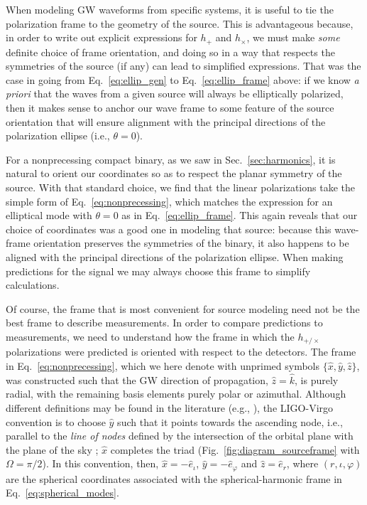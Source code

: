 \documentclass[aps,prd,twocolumn,superscriptaddress,preprintnumbers,floatfix,nofootinbib]{revtex4-2}
\newcommand*{\eq}[1]{Eq.~\eqref{eq:#1}}
\begin{document}
When modeling GW waveforms from specific systems, it is useful to tie the polarization frame to the geometry of the source.
This is advantageous because, in order to write out explicit expressions for $h_+$ and $h_\times$, we must make \emph{some} definite choice of frame orientation, and doing so in a way that respects the symmetries of the source (if any) can lead to simplified expressions.
That was the case in going from Eq.~\eqref{eq:ellip_gen} to Eq.~\eqref{eq:ellip_frame} above: if we know \emph{a priori} that the waves from a given source will always be elliptically polarized, then it makes sense to anchor our wave frame to some feature of the source orientation that will ensure alignment with the principal directions of the polarization ellipse (i.e., $\theta=0$).

For a nonprecessing compact binary, as we saw in Sec.~\ref{sec:harmonics}, it is natural to orient our coordinates so as to respect the planar symmetry of the source.
With that standard choice, we find that the linear polarizations take the simple form of \eq{nonprecessing}, which matches the expression for an elliptical mode with $\theta=0$ as in \eq{ellip_frame}.
This again reveals that our choice of coordinates was a good one in modeling that source: because this wave-frame orientation preserves the symmetries of the binary, it also happens to be aligned with the principal directions of the polarization ellipse.
%
When making predictions for the signal we may always choose this frame to simplify calculations.

Of course, the frame that is most convenient for source modeling need not be the best frame to describe measurements.
In order to compare predictions to measurements, we need to understand how the frame in which the $h_{+/\times}$ polarizations were predicted is oriented with respect to the detectors.
The frame in \eq{nonprecessing}, which we here denote with unprimed symbols $\{\hat{x}, \hat{y}, \hat{z}\}$, was constructed such that the GW direction of propagation, $\hat{z}=\hat{k}$, is purely radial, with the remaining basis elements purely polar or azimuthal.
Although different definitions may be found in the literature (e.g., \cite{Faye:2012we,Kidder:2007rt}), the LIGO-Virgo convention is to choose $\hat{y}$ such that it points towards the ascending node, i.e., parallel to the \emph{line of nodes} defined by the intersection of the orbital plane with the plane of the sky \cite{LALSuite:source}; $\hat{x}$ completes the triad (Fig.~\ref{fig:diagram_sourceframe} with $\Omega = \pi/2$).
In this convention, then, $\hat{x} = -\hat{e}_\iota$, $\hat{y} = -\hat{e}_\varphi$ and $\hat{z}=\hat{e}_r$, where $\left(r, \iota, \varphi\right)$ are the spherical coordinates associated with the spherical-harmonic frame in \eq{spherical_modes}.
\end{document}
